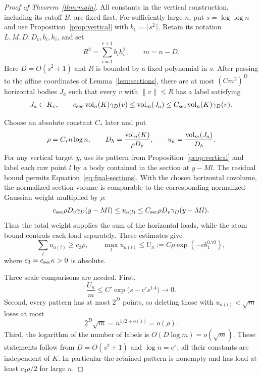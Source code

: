 \begin{proof}[Proof of Theorem~\ref{thm:main}]
All constants in the vertical construction, including its cutoff $B$,
are fixed first. For sufficiently large $n$, put $s=\log\log n$ and
use Proposition~\ref{prop:vertical} with $b_1=\lceil s^2\rceil$.
Retain its notation $L,M,D,D_v,b_i,h_i$, and set
\[
 R^2=\sum_{i=1}^{r+1}b_i h_i^2,\qquad m=n-D.
\]
Here $D=O(s^2+1)$ and $R$ is bounded by a fixed polynomial in $s$.
After passing to the affine coordinates of Lemma~\ref{lem:sections},
there are at most $(Cm^2)^D$ horizontal bodies $J_a$ such that every
$v$ with $\|v\|\le R$ has a label satisfying
\begin{equation}\label{eq:final-sections}
 J_a\subset K_v,\qquad
 c_{\rm sec}\operatorname{vol}_n(K)\gamma_D(v)
 \le\operatorname{vol}_m(J_a)\le
 C_{\rm sec}\operatorname{vol}_n(K)\gamma_D(v).
\end{equation}

Choose an absolute constant $C_*$ later and put
\begin{equation}\label{eq:target-density}
 \rho=C_*n\log n,\qquad
 D_h=\frac{\operatorname{vol}_n(K)}{\rho D_v},\qquad
 u_a=\frac{\operatorname{vol}_m(J_a)}{D_h}.
\end{equation}
For any vertical target $y$, use its pattern from
Proposition~\ref{prop:vertical} and label each raw point $l$ by a
body contained in the section at $y-Ml$. The residual bound permits
Equation~\eqref{eq:final-sections}. With the chosen horizontal covolume,
the normalized section volume is comparable to the corresponding
normalized Gaussian weight multiplied by $\rho$:
\[
 c_{\rm sec}\rho D_v\gamma_D(y-Ml)
 \le u_{a(l)}\le
 C_{\rm sec}\rho D_v\gamma_D(y-Ml).
\]
Thus the total weight supplies the sum of the horizontal loads, while
the atom bound controls each load separately. These estimates give
\begin{equation}\label{eq:final-loads}
 \sum_l u_{a(l)}\ge c_3\rho,\qquad
 \max_l u_{a(l)}\le U_n:=C\rho\exp(-c b_1^{0.70}),
\end{equation}
where $c_3=c_{\rm sec}\kappa>0$ is absolute.

Three scale comparisons are needed. First,
\begin{equation}\label{eq:load-upper-check}
 \frac{U_n}{m}
 \le C'\exp\bigl(s-c's^{1.4}\bigr)\longrightarrow0.
\end{equation}
Second, every pattern has at most $2^D$ points, so deleting those with
$u_{a(l)}<\sqrt m$ loses at most
\begin{equation}\label{eq:load-discard-check}
 2^D\sqrt m=n^{1/2+o(1)}=o(\rho).
\end{equation}
Third, the logarithm of the number of labels is
$O(D\log m)=o(\sqrt m)$. These statements follow from
$D=O(s^2+1)$ and $\log n=e^s$; all their constants are independent
of $K$. In particular the retained pattern is nonempty and has load
at least $c_3\rho/2$ for large $n$.


\end{proof}
